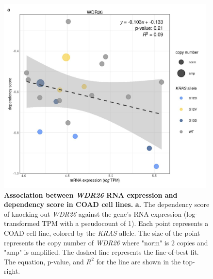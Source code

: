 \documentclass[english, 10pt, letterpaper]{article}
\newcommand{\KRAS}{\emph{KRAS}}
\begin{document}
\begin{figure}[p]
\centering
\includegraphics[height=100mm]{figures/Supp_Fig_6.jpeg}
\caption{
    \textbf{Association between \emph{WDR26} RNA expression and dependency score in COAD cell lines.}
    \textbf{a.} The dependency score of knocking out \emph{WDR26} against the gene's RNA expression (log-transformed TPM with a pseudocount of 1). Each point represents a COAD cell line, colored by the \KRAS{} allele. The size of the point represents the copy number of \emph{WDR26} where "norm" is 2 copies and "amp" is amplified. The dashed line represents the line-of-best fit. The equation, p-value, and $R^2$ for the line are shown in the top-right.
}
\label{sfig:coad-dep-wdr26}
\end{figure}
\end{document}
